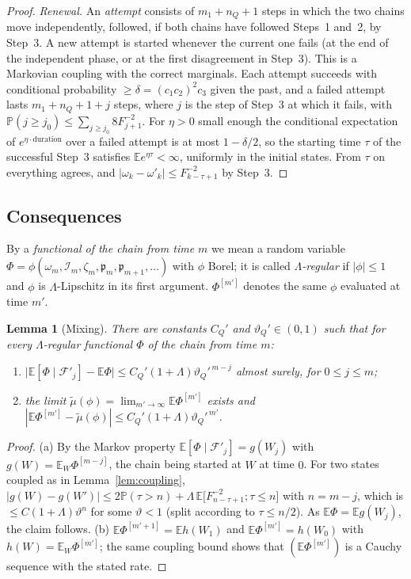 \documentclass[11pt]{amsart}
\newtheorem{lemma}[theorem]{Lemma}
\theoremstyle{definition}
\numberwithin{equation}{section}
\newcommand{\E}{\mathbb{E}}
\newcommand{\Prob}{\mathbb{P}}
\newcommand{\cF}{\mathcal{F}}
\newcommand{\cI}{\mathcal{I}}
\newcommand{\fp}{\mathfrak{p}}
\begin{document}
\begin{proof}
\emph{Renewal.} An \emph{attempt} consists of $m_1+n_Q+1$ steps in which the two chains move independently, followed, if both chains have followed
Steps~1 and~2, by Step~3. A new attempt is started whenever the current one fails (at the end of the independent phase, or at the first disagreement in
Step~3). This is a Markovian coupling with the correct marginals. Each attempt succeeds with conditional probability $\ge\delta=(c_1c_2)^2c_3$ given the
past, and a failed attempt lasts $m_1+n_Q+1+j$ steps, where $j$ is the step of Step~3 at which it fails, with
$\Prob(j\ge j_0)\le\sum_{j\ge j_0}8F_{j+1}^{-2}$. For $\eta>0$ small enough the conditional expectation of $e^{\eta\cdot\text{duration}}$ over a failed
attempt is at most $1-\delta/2$, so the starting time $\tau$ of the successful Step~3 satisfies $\E e^{\eta\tau}<\infty$, uniformly in the initial
states. From $\tau$ on everything agrees, and $|\omega_k-\omega'_k|\le F_{k-\tau+1}^{-2}$ by Step~3.
\end{proof}

\subsection{Consequences}
By a \emph{functional of the chain from time $m$} we mean a random variable $\Phi=\phi(\omega_m,\cI_m,\zeta_m,\fp_m,\fp_{m+1},\dots)$ with $\phi$ Borel; it is
called \emph{$\Lambda$-regular} if $|\phi|\le1$ and $\phi$ is $\Lambda$-Lipschitz in its first argument. $\Phi^{[m']}$ denotes the same $\phi$
evaluated at time $m'$.

\begin{lemma}[Mixing]\label{lem:mixing}
There are constants $C_Q'$ and $\vartheta_Q'\in(0,1)$ such that for every $\Lambda$-regular functional $\Phi$ of the chain from time $m$:
\begin{enumerate}
\item[(a)] $\big|\E[\Phi\mid\cF'_j]-\E\Phi\big|\le C_Q'(1+\Lambda)\vartheta_Q'^{\,m-j}$ almost surely, for $0\le j\le m$;
\item[(b)] the limit $\tilde\mu(\phi)=\lim_{m'\to\infty}\E\Phi^{[m']}$ exists and $|\E\Phi^{[m']}-\tilde\mu(\phi)|\le C_Q'(1+\Lambda)\vartheta_Q'^{\,m'}$.
\end{enumerate}
\end{lemma}

\begin{proof}
(a) By the Markov property $\E[\Phi\mid\cF'_j]=g(W_j)$ with $g(W)=\E_W\Phi^{[m-j]}$, the chain being started at $W$ at time $0$. For two states
coupled as in Lemma~\ref{lem:coupling}, $|g(W)-g(W')|\le2\Prob(\tau>n)+\Lambda\,\E\big[F_{n-\tau+1}^{-2};\tau\le n\big]$ with $n=m-j$, which is
$\le C(1+\Lambda)\vartheta^n$ for some $\vartheta<1$ (split according to $\tau\le n/2$). As $\E\Phi=\E g(W_j)$, the claim follows.
(b) $\E\Phi^{[m'+1]}=\E h(W_1)$ and $\E\Phi^{[m']}=h(W_0)$ with $h(W)=\E_W\Phi^{[m']}$; the same coupling bound shows that $(\E\Phi^{[m']})$ is a Cauchy
sequence with the stated rate.
\end{proof}
\end{document}
